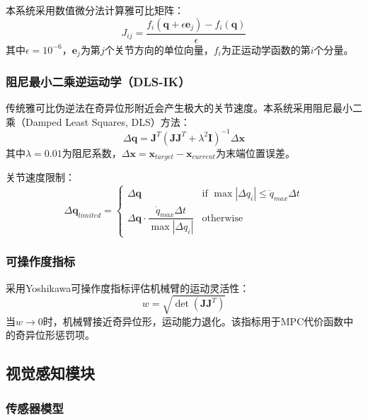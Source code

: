 \documentclass[12pt,a4paper]{ctexart}
\begin{document}
本系统采用数值微分法计算雅可比矩阵：
\begin{equation}
  J_{ij} = \frac{f_i(\mathbf{q} + \epsilon \mathbf{e}_j) - f_i(\mathbf{q})}{\epsilon}
\end{equation}
其中$\epsilon = 10^{-6}$，$\mathbf{e}_j$为第$j$个关节方向的单位向量，$f_i$为正运动学函数的第$i$个分量。

\subsubsection{阻尼最小二乘逆运动学（DLS-IK）}

传统雅可比伪逆法在奇异位形附近会产生极大的关节速度\cite{wampler1986}。本系统采用阻尼最小二乘（Damped Least Squares, DLS）方法：
\begin{equation}
  \Delta\mathbf{q} = \mathbf{J}^T(\mathbf{J}\mathbf{J}^T + \lambda^2\mathbf{I})^{-1} \Delta\mathbf{x}
\end{equation}
其中$\lambda = 0.01$为阻尼系数，$\Delta\mathbf{x} = \mathbf{x}_{target} - \mathbf{x}_{current}$为末端位置误差。

关节速度限制：
\begin{equation}
  \Delta\mathbf{q}_{limited} = \begin{cases} \Delta\mathbf{q} & \text{if } \max|\Delta q_i| \leq \dot{q}_{max}\Delta t \\ \Delta\mathbf{q} \cdot \dfrac{\dot{q}_{max}\Delta t}{\max|\Delta q_i|} & \text{otherwise} \end{cases}
\end{equation}

\subsubsection{可操作度指标}

采用Yoshikawa可操作度指标评估机械臂的运动灵活性\cite{yoshikawa1985}：
\begin{equation}
  w = \sqrt{\det(\mathbf{J}\mathbf{J}^T)}
\end{equation}
当$w \to 0$时，机械臂接近奇异位形，运动能力退化。该指标用于MPC代价函数中的奇异位形惩罚项。


\subsection{视觉感知模块}

\subsubsection{传感器模型}
\end{document}
